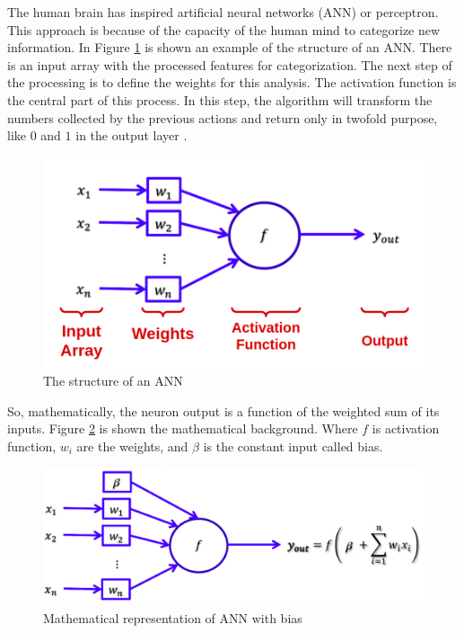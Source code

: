 The human brain has inspired artificial neural networks (ANN) or perceptron. This approach is because of the capacity of the human mind to categorize new information. In Figure \ref{fig:ann} is shown an example of the structure of an ANN. There is an input array with the processed features for categorization. The next step of the processing is to define the weights for this analysis. The activation function is the central part of this process. In this step, the algorithm will transform the numbers collected by the previous actions and return only in twofold purpose, like $0$ and $1$ in the output layer \cite{goodfellow2016deep}.

\begin{figure}[H]
\centering
\includegraphics[width=\columnwidth]{imagens/ann.png}
\caption{The structure of an ANN \cite{lecture}}
\label{fig:ann}
\end{figure}

So, mathematically, the neuron output is a function of the weighted sum of its inputs. Figure \ref{fig:ann_weight} is shown the mathematical background. Where $f$ is activation function, $w_i$ are the weights, and $\beta$ is the constant input called bias.


\begin{figure}[H]
\centering
\includegraphics[width=\columnwidth]{imagens/math_ann_bias.png}
\caption{Mathematical representation of ANN with bias \cite{lecture}}
\label{fig:ann_weight}
\end{figure}


